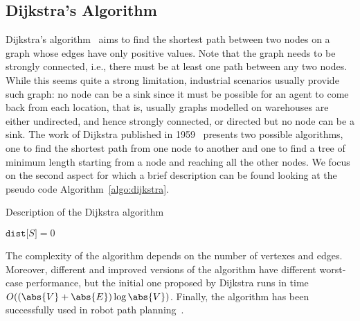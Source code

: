 \subsection{Dijkstra's Algorithm}
Dijkstra's algorithm~\cite{dijkstra} aims to find the shortest path between two
nodes on a graph whose edges have only positive values. Note that the graph
needs to be strongly connected, i.e., there must be at least one path between
any two nodes. While this seems quite a strong limitation, industrial scenarios
usually provide such graph: no node can be a sink since it must be possible for
an agent to come back from each location, that is, usually graphs modelled on
warehouses are either undirected, and hence strongly connected, or directed but
no node can be a sink. \newline
The work of Dijkstra published in 1959~\cite{dijkstra} presents two possible
algorithms, one to find the shortest path from one node to another and one to
find a tree of minimum length starting from a node and reaching all the other
nodes. We focus on the second aspect for which a brief description can be found
looking at the pseudo code Algorithm~\ref{algo:dijkstra}.
\begin{algorithm}
  \DontPrintSemicolon
  \caption{Description of the Dijkstra algorithm}
  \label{algo:dijkstra}

  \;

  \;

  $\texttt{dist[}S\texttt{]}=0$\;
  \;
\end{algorithm}\newline
The complexity of the algorithm depends on the number of vertexes and edges.
Moreover, different and improved versions of the algorithm have different
worst-case performance, but the initial one proposed by Dijkstra runs in time
$O((\abs{V}+\abs{E})\log\abs{V})$.\newline
Finally, the algorithm has been successfully used in robot path
planning~\cite{dijkstra1, dijkstra2,dijkstra3}.
%
%
